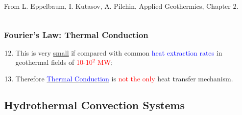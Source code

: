 \documentclass[10pt,compress]{beamer}
\newcommand{\red}{\textcolor{red}}
\newcommand{\blue}{\textcolor{blue}}
\begin{document}
\begin{frame}
\begin{columns}
\begin{column}[c]{0.55\linewidth}
{          \scriptsize From L. Eppelbaum, I. Kutasov, A. Pilchin, Applied Geothermics, Chapter 2.}
    \end{column}  
  \end{columns}
\end{frame} 

\begin{frame}
 \frametitle{Fourier's Law: Thermal Conduction}
    \begin{enumerate}[1.]\setcounter{enumi}{11} \scriptsize
       \item <1-> This is very \underline{small} if compared with common \blue{heat extraction rates} in geothermal fields of \red{10-10$^{2}$ MW};
       \item <2-> Therefore \underline{\blue{Thermal Conduction}} is \red{not the only} heat transfer mechanism.
    \end{enumerate}

\end{frame}


\subsection{Hydrothermal Convection Systems}
\end{document}
